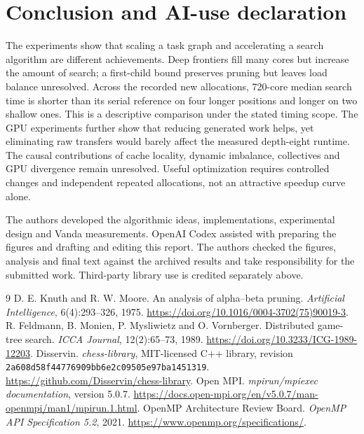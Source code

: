 \documentclass[11pt,a4paper]{article}
\newcommand{\code}[1]{\texttt{#1}}
\begin{document}
\section{Conclusion and AI-use declaration}
The experiments show that scaling a task graph and accelerating a search
algorithm are different achievements. Deep frontiers fill many cores but
increase the amount of search; a first-child bound preserves pruning but leaves
load balance unresolved. Across the recorded new allocations, 720-core median search time is shorter
than its serial reference on four longer positions and longer on two shallow
ones. This is a descriptive comparison under the stated timing scope. The GPU experiments further show that reducing generated work helps,
yet eliminating raw transfers would barely affect the measured depth-eight
runtime. The causal contributions of cache locality, dynamic imbalance, collectives and
GPU divergence remain unresolved. Useful optimization requires controlled
changes and independent repeated allocations, not an attractive speedup curve alone.

The authors developed the algorithmic ideas, implementations, experimental
design and Vanda measurements. OpenAI Codex assisted with preparing the
figures and drafting and editing this report. The authors checked the figures,
analysis and final text against the archived results and take responsibility
for the submitted work. Third-party library use is credited separately above.

\begingroup\raggedright
\begin{thebibliography}{9}
D. E. Knuth and R. W. Moore. An analysis of alpha--beta pruning.
\emph{Artificial Intelligence}, 6(4):293--326, 1975.
\url{https://doi.org/10.1016/0004-3702(75)90019-3}.
R. Feldmann, B. Monien, P. Mysliwietz and O. Vornberger.
Distributed game-tree search. \emph{ICCA Journal}, 12(2):65--73, 1989.
\url{https://doi.org/10.3233/ICG-1989-12203}.
Disservin. \emph{chess-library}, MIT-licensed C++ library,
revision\\
\code{2a608d58f44776909bb6e2c09505e97ba1451319}.
\url{https://github.com/Disservin/chess-library}.
Open MPI. \emph{mpirun/mpiexec documentation}, version 5.0.7.
\url{https://docs.open-mpi.org/en/v5.0.7/man-openmpi/man1/mpirun.1.html}.
OpenMP Architecture Review Board. \emph{OpenMP API Specification
5.2}, 2021. \url{https://www.openmp.org/specifications/}.
\end{thebibliography}
\endgroup
\end{document}
